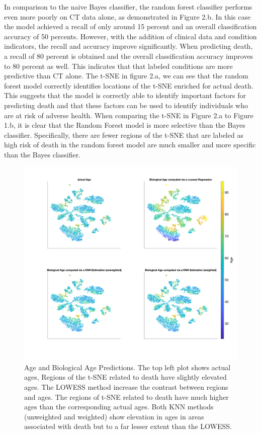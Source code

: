 \documentclass{article}
\begin{document}
In comparison to the naive Bayes classifier, the random forest classifier performs even more poorly on CT data alone, as demonstrated in Figure 2.b. In this case the model achieved a recall of only around 15 percent and an overall classification accuracy of 50 percents. However, with the addition of clinical data and condition indicators, the recall and accuracy improve significantly. When predicting death, a recall of 80 percent is obtained and the overall classification accuracy improves to 80 percent as well. This indicates that that labeled conditions are more predictive than CT alone. The t-SNE in figure 2.a, we can see that the random forest model  correctly identifies locations of the t-SNE enriched for actual death. This suggests that the model is correctly able to identify important factors for predicting death and that these factors can be used to identify individuals who are at risk of adverse health. When comparing the t-SNE in Figure 2.a to Figure 1.b, it is clear that the Random Forest model is more selective than the Bayes classifier. Specifically, there are fewer regions of the t-SNE that are labeled as high risk of death in the random forest model are much smaller and more specific than the Bayes classifier. 

\begin{figure}[!h]
\centering
\includegraphics[width=.9\textwidth]{results/Conditions_data_bio_age.png}
\caption{Age and Biological Age Predictions. The top left plot shows actual ages, Regions of the t-SNE related to death have slightly elevated ages. The LOWESS method increase the contrast between regions and ages. The regions of t-SNE related to death have much higher ages than the corresponding actual ages. Both KNN methods (unweighted and weighted) show elevation in ages in areas associated with death but to a far lesser extent than the LOWESS. }
\end{figure}
 
\end{document}

